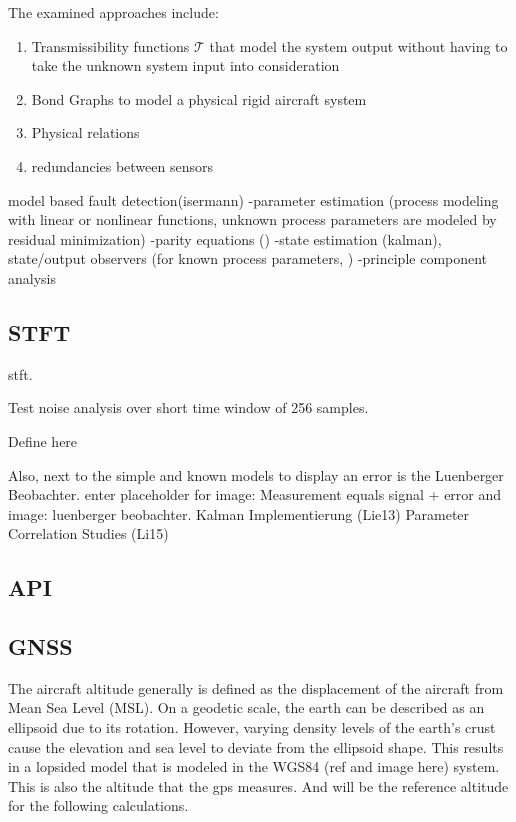 The examined approaches include:
\begin{enumerate}
    \item Transmissibility functions $\mathcal{T}$ that model the system output without having to take the unknown
    system input into consideration
    \item Bond Graphs to model a physical rigid aircraft system
    \item Physical relations
    \item redundancies between sensors
\end{enumerate}

model based fault detection(isermann)
-parameter estimation (process modeling with linear or nonlinear functions, unknown process parameters are modeled by residual minimization)
-parity equations ()
-state estimation (kalman), state/output observers (for known process parameters, )
-principle component analysis

\subsection{STFT}
stft.

Test noise analysis over short time window of 256 samples.

Define here


Also, next to the simple and known models to display an error is the Luenberger Beobachter.
enter placeholder for image: Measurement equals signal + error
and image: luenberger beobachter. Kalman Implementierung (Lie13)
Parameter Correlation Studies (Li15)

\subsection{API}

\subsection{GNSS}

The aircraft altitude generally is defined as the displacement of the aircraft from Mean Sea Level (MSL).
On a geodetic scale, the earth can be described as an ellipsoid due to its rotation. However, varying density levels of the earth's crust cause the elevation and sea level to deviate from the ellipsoid shape. This results in a lopsided model that is modeled in the WGS84 (ref and image here) system. This is also the altitude that the gps measures. And will be the reference altitude for the following calculations.


